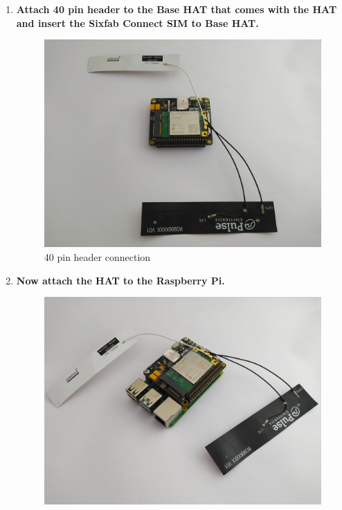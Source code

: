 \documentclass[12pt, letterpaper]{article}
\begin{document}
\begin{enumerate}[label=\large{\textbf{\arabic*}.}]
\begin{itemize}
	\end{itemize}
	\item \textbf{\large{Attach 40 pin header to the Base HAT that comes with the HAT and insert the Sixfab Connect SIM to Base HAT.}}
	\begin{figure}[h!]
	\centering
	\includegraphics[width=1\columnwidth]{assets/Raspberry-Pi-Base-HAT-Quectel-Getting-Started-3-scaled.jpg}
	\caption{40 pin header connection}
	\end{figure}
	\newpage	
	\item \textbf{\large{Now attach the HAT to the Raspberry Pi.}}
	\begin{figure}[h!]
	\centering
	\includegraphics[width=1\columnwidth]{assets/Raspberry-Pi-Base-HAT-Quectel-Getting-Started-4-scaled.jpg}

\end{figure}
\end{enumerate}
\end{document}
